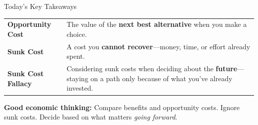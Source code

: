 \documentclass[9pt,english,aspectratio=169]{beamer}
\begin{document}
\begin{frame}{Today's Key Takeaways}

  \begin{tabular}{@{} l p{10cm} @{}}
    \textbf{Opportunity Cost} & The value of the \textbf{next best alternative} when you make a choice. \\[0.5em]
    \textbf{Sunk Cost} & A cost you \textbf{cannot recover}---money, time, or effort already spent. \\[0.5em]
    \textbf{Sunk Cost Fallacy} & Considering sunk costs when deciding about the \textbf{future}---staying on a path only because of what you've already invested. \\
  \end{tabular}

  \vspace{0.5em}
  \begin{insightbox}
    \textbf{Good economic thinking:} Compare benefits and opportunity costs.
    Ignore sunk costs. Decide based on what matters \emph{going forward}.
  \end{insightbox}

\end{frame}
\end{document}
